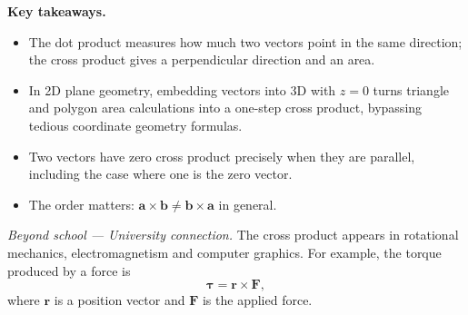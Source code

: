 \vspace{0.8em}
\noindent\textbf{Key takeaways.}
\begin{itemize}[leftmargin=*,itemsep=2pt]
  \item The dot product measures how much two vectors point in the
        same direction; the cross product gives a perpendicular
        direction and an area.
  \item In 2D plane geometry, embedding vectors into 3D with $z=0$ turns
        triangle and polygon area calculations into a one-step cross
        product, bypassing tedious coordinate geometry formulas.
  \item Two vectors have zero cross product precisely when they are
        parallel, including the case where one is the zero vector.
  \item The order matters:
        $\mathbf{a}\times\mathbf{b} \ne \mathbf{b}\times\mathbf{a}$
        in general.
\end{itemize}

\vspace{0.4em}
\noindent\textit{Beyond school --- University connection.}
The cross product appears in rotational mechanics, electromagnetism
and computer graphics. For example, the torque produced by a force is
\[
  \boldsymbol{\tau} = \mathbf{r} \times \mathbf{F},
\]
where $\mathbf{r}$ is a position vector and $\mathbf{F}$ is the
applied force.

\endgroup
